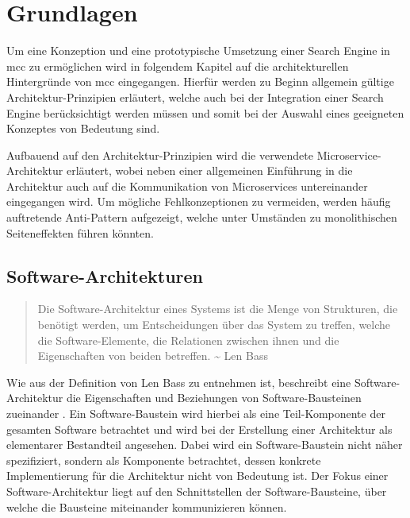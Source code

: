 \chapter{Grundlagen\label{chap2:Zweites-Kapitel}}

Um eine Konzeption und eine prototypische Umsetzung einer Search Engine in \gls{mcc} zu ermöglichen wird in folgendem Kapitel auf die architekturellen Hintergründe von \gls{mcc} eingegangen. Hierfür werden zu Beginn allgemein gültige Architektur-Prinzipien erläutert, welche auch bei der Integration einer Search Engine berücksichtigt werden müssen und somit bei der Auswahl eines geeigneten Konzeptes von Bedeutung sind.

Aufbauend auf den Architektur-Prinzipien wird die verwendete Microservice-Architektur erläutert, wobei neben einer allgemeinen Einführung in die Architektur auch auf die Kommunikation von Microservices untereinander eingegangen wird. Um mögliche Fehlkonzeptionen zu vermeiden, werden häufig auftretende Anti-Pattern aufgezeigt, welche unter Umständen zu monolithischen Seiteneffekten führen könnten.


\section{Software-Architekturen\label{sec2.1:Unterpunkt-1}}

\begin{quote}
    Die Software-Architektur eines Systems ist die Menge von Strukturen, die benötigt werden, um Entscheidungen über das System zu treffen, welche die Software-Elemente, die Relationen zwischen ihnen und die Eigenschaften von beiden betreffen. \textasciitilde{} Len Bass \cite{Bass.2013}
\end{quote}

Wie aus der Definition von Len Bass zu entnehmen ist, beschreibt eine Software-Architektur die Eigenschaften und Beziehungen von Software-Bausteinen zueinander \cite{Bass.2013}. Ein Software-Baustein wird hierbei als eine Teil-Komponente der gesamten Software betrachtet und wird bei der Erstellung einer Architektur als elementarer Bestandteil angesehen. Dabei wird ein Software-Baustein nicht näher spezifiziert, sondern als Komponente betrachtet, dessen konkrete Implementierung für die Architektur nicht von Bedeutung ist. Der Fokus einer Software-Architektur liegt auf den Schnittstellen der Software-Bausteine, über welche die Bausteine miteinander kommunizieren können.

